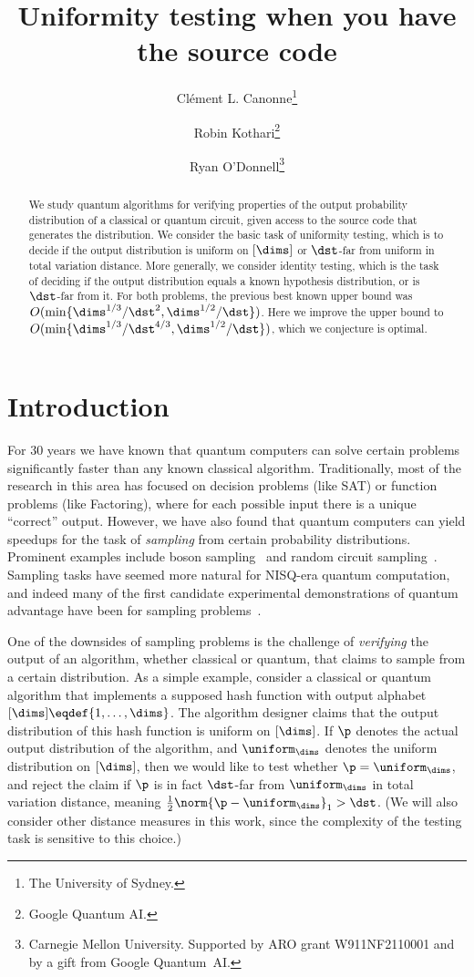 \documentclass[11pt]{article}
\title{\vspace{-3ex}\bfseries Uniformity testing when you have the source code\vspace{-0.5ex}}
\author{Cl\'ement L. Canonne\thanks{The University of Sydney.} 
\and Robin Kothari\thanks{Google Quantum AI.} 
\and Ryan O'Donnell\thanks{Carnegie Mellon University. Supported by ARO grant W911NF2110001 and by a gift from Google Quantum~AI.}}
\date{\vspace{-5ex}}
\begin{document}
\maketitle
\begin{abstract}
  We study quantum algorithms for verifying properties of the output probability distribution of a classical or quantum circuit, given access to the source code that generates the distribution. We consider the basic task of uniformity testing, which is to decide if the output distribution is uniform on $[\dims]$ or $\dst$-far from uniform in total variation distance.  More generally, we  consider identity testing, which is the task of deciding if the output distribution equals a known hypothesis distribution, or is $\dst$-far from it. For both problems, the previous best known upper bound was $O(\min\{\dims^{1/3}/\dst^{2},\dims^{1/2}/\dst\})$. 
  Here we improve the upper bound to $O(\min\{\dims^{1/3}/\dst^{4/3}, \dims^{1/2}/\dst\})$, which we conjecture is optimal.
\end{abstract}

\section{Introduction}
%
For 30 years we have known that quantum computers can solve certain problems significantly faster than any known classical algorithm. 
Traditionally, most of the research in this area has focused on decision problems (like SAT) or function problems (like Factoring), where for each possible input there is a unique ``correct'' output.
%
However, we have also found that quantum computers can yield speedups for the task of \emph{sampling} from certain probability distributions. Prominent examples include boson sampling~\cite{AA13} and random circuit sampling~\cite{BIS+18}. 
Sampling tasks have seemed more natural for NISQ-era quantum computation, and indeed many of the first candidate experimental demonstrations of quantum advantage have been for sampling problems~\cite{AAB+19}. 
%

One of the downsides of sampling problems is the challenge of \emph{verifying} the output of an algorithm, whether classical or quantum, that claims to sample from a certain distribution. 
As a simple example, consider a classical or quantum algorithm that implements a supposed hash function with output alphabet $[\dims]\eqdef\{1,\ldots,\dims\}$. The algorithm designer claims that the output distribution of this hash function is uniform on $[\dims]$. %
If $\p$ denotes the actual output distribution of the algorithm, and $\uniform_\dims$ denotes the uniform distribution on $[\dims]$, then we would like to test whether $\p=\uniform_\dims$, and reject the claim if $\p$ is in fact $\dst$-far from $\uniform_\dims$ in total variation distance, meaning $\frac{1}{2} \norm{\p-\uniform_\dims}_1 > \dst$.
%
(We will also consider other distance measures in this work, since the complexity of the testing task is sensitive to this choice.) 
\end{document}
